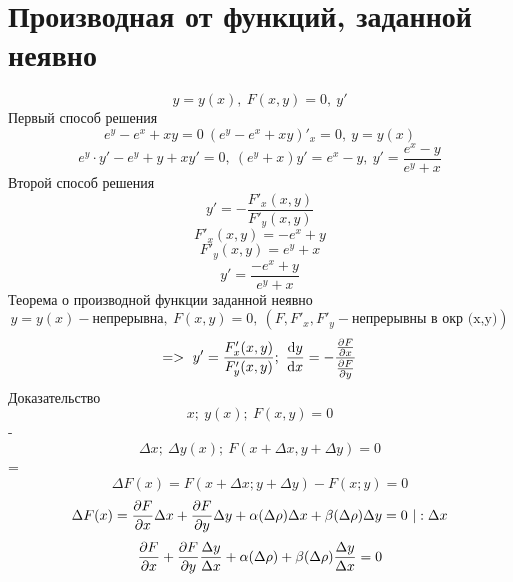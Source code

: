 \documentclass{article}
\begin{document}
\section{Производная от функций, заданной неявно}
\begin{equation*}
    y=y(x),\ F(x,y)=0,\ y'
\end{equation*}
Первый способ решения
\begin{equation*}
    e^y-e^x+xy=0\ (e^y-e^x+xy)'_x=0,\ y = y(x)
\end{equation*}
\begin{equation*}
    e^y\cdot y'-e^y+y+xy'=0,\ (e^y+x)y' = e^x-y,\ y' = \frac{e^x-y}{e^y+x}
\end{equation*}
Второй способ решения
\begin{equation}
    y' = -\frac{F'_x(x,y)}{F'_y(x,y)}
\end{equation}
\begin{equation*}
    F'_x(x,y) = -e^x+y
\end{equation*}
\begin{equation*}
    F'_y(x,y) = e^y+x
\end{equation*}
\begin{equation*}
    y' = \frac{-e^x+y}{e^y+x}
\end{equation*}
Теорема о производной функции заданной неявно
\begin{equation*}
    y= y(x)- \text{непрерывна},\ F(x,y) = 0,\ (F,F'_x,F'_y - \text{непрерывны в окр (x,y)})
\end{equation*}
\begin{equation}
    =>\ y' = \frac{F'_x(x,y)}{F'_y(x,y)};\ \dv{y}{x}= -\frac{\pdv{F}{x}(x,y)}{\pdv{F}{y}(x,y)}
\end{equation}
Доказательство
\begin{equation*}
    x;\ y(x);\ F(x,y) = 0
\end{equation*}
-
\begin{equation*}
    \Delta x;\ \Delta y(x);\ F(x+\Delta x,y+\Delta y) = 0
\end{equation*}
=
\begin{equation*}
    \Delta F(x) = F(x+\Delta x; y+ \Delta y) - F(x;y) = 0
\end{equation*}
\begin{equation*}
    \Delta F(x) = \pdv{F}{x}\Delta x + \pdv{F}{y}\Delta y + \alpha(\Delta \rho)\Delta x + \beta (\Delta \rho) \Delta y = 0\ | :\Delta x
\end{equation*}
\begin{equation*}
     \pdv{F}{x} + \pdv{F}{y}\frac{\Delta y}{\Delta x} + \alpha(\Delta \rho) + \beta (\Delta \rho) \frac{\Delta y}{\Delta x} = 0
\end{equation*}
\end{document}
